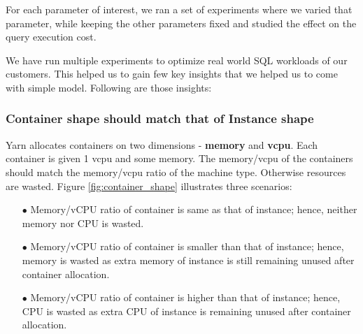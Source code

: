 For each parameter of interest, we ran a set of experiments where we varied that parameter, while keeping the other parameters fixed and studied the effect on the query execution cost. 

We have run multiple experiments to optimize real world SQL workloads of our customers. This helped us to gain few key insights that we helped us to come with simple model. Following are those insights:

\noindent\subsubsection*{\bf Container shape should match that of Instance shape}
Yarn allocates containers on two dimensions - \textbf{memory} and \textbf{vcpu}. Each container is given 1 vcpu and some memory. The memory/vcpu of the containers should match the memory/vcpu ratio of the machine type. Otherwise resources are wasted. Figure \ref{fig:container_shape} illustrates three scenarios:
\begin{enumerate}[label=(\alph*)]
\item[$\bullet$] Memory/vCPU ratio of container is same as that of instance; hence, neither memory nor CPU is wasted. 
\item[$\bullet$] Memory/vCPU ratio of container is smaller than that of instance; hence, memory is wasted as extra memory of instance is still remaining unused after container allocation.
\item[$\bullet$] Memory/vCPU ratio of container is higher than that of instance; hence, CPU is wasted as extra CPU of instance is remaining unused after container allocation.
\end{enumerate}

